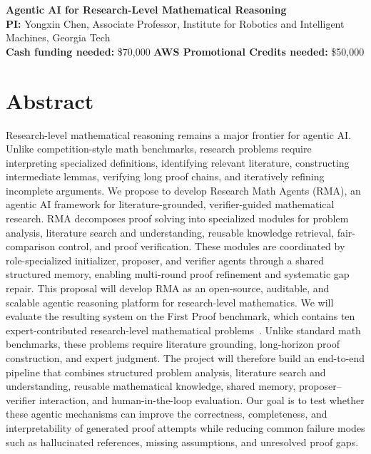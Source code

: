 \documentclass[11pt]{article}
\begin{document}
\begin{center}
    {\Large \textbf{Agentic AI for Research-Level Mathematical Reasoning}}\\[6pt]
    \textbf{PI:} Yongxin Chen, Associate Professor, Institute for Robotics and Intelligent Machines, Georgia Tech \\
    \textbf{Cash funding needed:} \$70,000 \qquad
    \textbf{AWS Promotional Credits needed:} \$50,000\\
\end{center}

\section*{Abstract}

Research-level mathematical reasoning remains a major frontier for agentic AI. Unlike competition-style math benchmarks, research problems require interpreting specialized definitions, identifying relevant literature, constructing intermediate lemmas, verifying long proof chains, and iteratively refining incomplete arguments. We propose to develop Research Math Agents (RMA), an agentic AI framework for literature-grounded, verifier-guided mathematical research. RMA decomposes proof solving into specialized modules for problem analysis, literature search and understanding, reusable knowledge retrieval, fair-comparison control, and proof verification. These modules are coordinated by role-specialized initializer, proposer, and verifier agents through a shared structured memory, enabling multi-round proof refinement and systematic gap repair. This proposal will develop RMA as an open-source, auditable, and scalable agentic reasoning platform for research-level mathematics. We will evaluate the resulting system on the First Proof benchmark, which contains ten expert-contributed research-level mathematical problems~\citep{abouzaid2026first}. Unlike standard math benchmarks, these problems require literature grounding, long-horizon proof construction, and expert judgment. The project will therefore build an end-to-end pipeline that combines structured problem analysis, literature search and understanding, reusable mathematical knowledge, shared memory, proposer--verifier interaction, and human-in-the-loop evaluation. Our goal is to test whether these agentic mechanisms can improve the correctness, completeness, and interpretability of generated proof attempts while reducing common failure modes such as hallucinated references, missing assumptions, and unresolved proof gaps.
\end{document}
